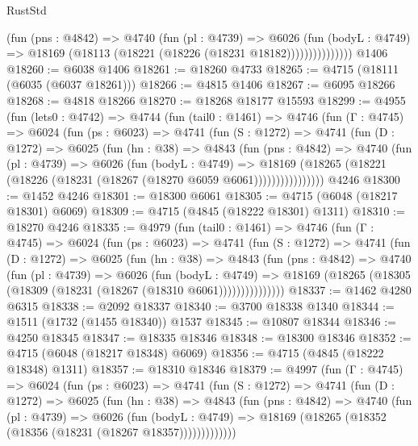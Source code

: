 \begin{lexlean}{RustStd}
\begin{coremodule}
                    (fun (pns : @4842) =>
                    @4740
                      (fun (pl : @4739) =>
                      @6026
                        (fun (bodyL : @4749) =>
                        @18169 (@18113 (@18221 (@18226 (@18231 @18182)))))))))))))))
    @1406
@18260 := @6038 @1406
@18261 := @18260 @4733
@18265 := @4715 (@18111 (@6035 (@6037 @18261)))
@18266 := @4815 @1406
@18267 := @6095 @18266
@18268 := @4818 @18266
@18270 := @18268 @18177 @15593
@18299 := @4955
    (fun (lets0 : @4742) =>
    @4744
      (fun (tail0 : @1461) =>
      @4746
        (fun (Γ : @4745) =>
        @6024
          (fun (ps : @6023) =>
          @4741
            (fun (S : @1272) =>
            @4741
              (fun (D : @1272) =>
              @6025
                (fun (hn : @38) =>
                @4843
                  (fun (pns : @4842) =>
                  @4740
                    (fun (pl : @4739) =>
                    @6026
                      (fun (bodyL : @4749) =>
                      @18169
                        (@18265 (@18221 (@18226 (@18231 (@18267 (@18270 @6059 @6061))))))))))))))))
    @4246
@18300 := @1452 @4246
@18301 := @18300 @6061
@18305 := @4715 (@6048 (@18217 @18301) @6069)
@18309 := @4715 (@4845 (@18222 @18301) @1311)
@18310 := @18270 @4246
@18335 := @4979
    (fun (tail0 : @1461) =>
    @4746
      (fun (Γ : @4745) =>
      @6024
        (fun (ps : @6023) =>
        @4741
          (fun (S : @1272) =>
          @4741
            (fun (D : @1272) =>
            @6025
              (fun (hn : @38) =>
              @4843
                (fun (pns : @4842) =>
                @4740
                  (fun (pl : @4739) =>
                  @6026
                    (fun (bodyL : @4749) =>
                    @18169 (@18265 (@18305 (@18309 (@18231 (@18267 (@18310 @6061)))))))))))))))
@18337 := @1462 @4280 @6315
@18338 := @2092 @18337
@18340 := @3700 @18338 @1340
@18344 := @1511 (@1732 (@1455 @18340)) @1537
@18345 := @10807 @18344
@18346 := @4250 @18345
@18347 := @18335 @18346
@18348 := @18300 @18346
@18352 := @4715 (@6048 (@18217 @18348) @6069)
@18356 := @4715 (@4845 (@18222 @18348) @1311)
@18357 := @18310 @18346
@18379 := @4997
    (fun (Γ : @4745) =>
    @6024
      (fun (ps : @6023) =>
      @4741
        (fun (S : @1272) =>
        @4741
          (fun (D : @1272) =>
          @6025
            (fun (hn : @38) =>
            @4843
              (fun (pns : @4842) =>
              @4740
                (fun (pl : @4739) =>
                @6026
                  (fun (bodyL : @4749) =>
                  @18169 (@18265 (@18352 (@18356 (@18231 (@18267 @18357)))))))))))))

\end{coremodule}
\end{lexlean}
